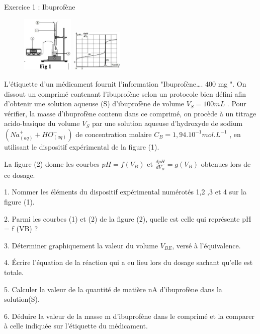 \documentclass[12pt, french]{article}
\begin{document}
\begin{center}

\end{center}

\vspace{-0.2cm}
   \begin{Box2}{Exercice 1 : Ibuprofène  }

\begin{figure}
  \begin{center}
	  \vspace{-0.6cm}
	\includegraphics[width=0.22\textwidth]{./img/Dosage_00.png}
	\includegraphics[width=0.22\textwidth]{./img/Dosage_00_1.png}
  \end{center}
\end{figure}


L’étiquette d’un médicament fournit l'information "Ibuprofène…. 400 mg ".
On dissout un comprimé contenant l’ibuprofène selon un protocole bien défini afin
d'obtenir une solution aqueuse (S) d’ibuprofène de volume $V_S =100 mL$ .
Pour vérifier, la masse d’ibuprofène contenu dans ce comprimé, on procède à un titrage acido-basique du volume $V_S$ par une solution aqueuse d’hydroxyde de sodium $(Na^+_{(aq)}  + HO^-_{(aq)})$ de concentration molaire $C_B = 1,94.10^{-1} mol.L^{-1}$ , en utilisant le dispositif
expérimental de la figure (1).

La figure (2) donne les courbes $pH=f(V_B)$ et $\frac{dpH}{dV_B} = g(V_B)$ obtenues lors de ce dosage.

1. Nommer les éléments du dispositif expérimental numérotés 1,2 ,3 et 4
sur la figure (1).

2. Parmi les courbes (1) et (2) de la figure (2), quelle est celle qui
représente pH = f (VB) ?

3. Déterminer graphiquement la valeur du volume $V_{BE}$, versé à
l'équivalence.

4. Écrire l’équation de la réaction qui a eu lieu lors du dosage sachant
qu'elle est totale.

5. Calculer la valeur de la quantité de matière nA d'ibuprofène dans la
solution(S).

6. Déduire la valeur de la masse m d’ibuprofène dans le comprimé et la
comparer à celle indiquée sur l'étiquette du médicament.

   \end{Box2}
\end{document}

